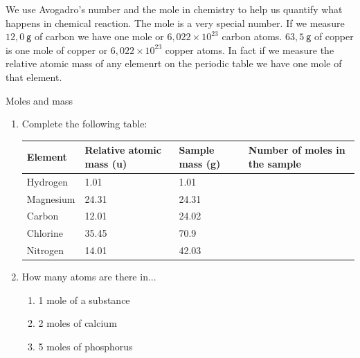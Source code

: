 We use Avogadro's number and the mole in chemistry to help us quantify what happens in chemical reaction. The mole is a very special number. If we measure $12,0 ~\mathsf{g}$ of carbon we have one mole or $6,022 \times 10^{23}$ carbon atoms. $63,5 ~\mathsf{g}$ of copper is one mole of copper or $6,022 \times 10^{23}$ copper atoms. In fact if we measure the relative atomic mass of any elemenrt on the periodic table we have one mole of that element.
	\par
\label{m38717*secfhsst!!!underscore!!!id127}
            \begin{exercises}{Moles and mass
      }
            \nopagebreak
      \label{m38717*id276067}\begin{enumerate}[noitemsep, label=\textbf{\arabic*}. ] 
            \label{m38717*uid2}\item 
Complete the following table:
          \begin{table}[H]
        \begin{center}
      \label{m38717*id276082}
    \noindent
      \begin{tabular}{|l|l|l|l|}\hline
\textbf{Element} & \textbf{Relative atomic mass (u)} & \textbf{Sample mass (g)} & \textbf{Number of moles in the sample} \\ \hline
        Hydrogen & 1.01 & 1.01 & \\ \hline
        Magnesium & 24.31 & 24.31 & \\ \hline
        Carbon & 12.01 & 24.02 & \\ \hline
        Chlorine & 35.45 & 70.9 & \\ \hline
        Nitrogen & 14.01 & 42.03 & \\ \hline
    \end{tabular}
      \end{center}
\end{table}
    \par
          \label{m38717*uid3}\item 
How many atoms are there in...
\label{m38717*id276311}\begin{enumerate}[noitemsep, label=\textbf{\alph*}. ] 
            \label{m38717*uid4}\item 1 mole of a substance
\label{m38717*uid5}\item 2 moles of calcium
\label{m38717*uid6}\item 5 moles of phosphorus

\end{enumerate}
\end{enumerate}
\end{exercises}
